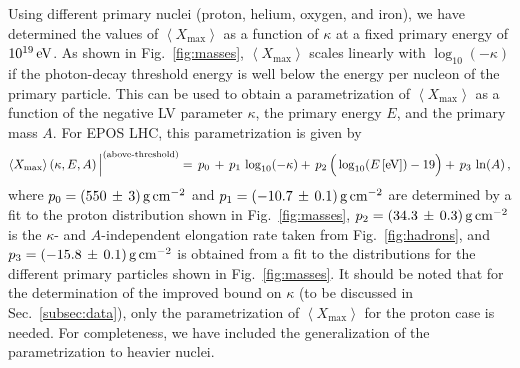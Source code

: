 \documentclass[aps,prd,preprint,longbibliography]{revtex4-1}
\begin{document}
Using different primary nuclei (proton, helium, oxygen, and iron), we have determined
the values of $\left<X_\text{max}\right>$ as a function of $\kappa$ at
a fixed primary energy of $\unit[10^{19}]{eV}$.
As shown in Fig.~\ref{fig:masses},
$\left<X_\text{max}\right>$ scales linearly
with $\log_{10}(-\kappa)$ if the photon-decay
threshold energy is well below the energy per nucleon
of the primary particle. This can be used to obtain a
parametrization of $\left<X_\text{max}\right>$ as a function of
the negative LV parameter $\kappa$,
the primary energy $E$, and the primary mass $A$. For EPOS LHC, this
parametrization is given by%
\begin{equation}
\left<X_\text{max}\right>(\kappa, E, A)
\,\Big|^\text{(above-threshold)}
=\,p_0\,+\,p_1\,\log_{10}(-\kappa)\\
+\,p_2\,\Big(\log_{10}(E\,\unit{[eV]})-19\Big)\\
+\,p_3\,\ln(A)\,,
\label{eq:xmaxparametrization}
\end{equation}
where $p_0 = \unit[(550\,\pm\,3)]{g\,cm^{-2}}$ and $p_1 =
\unit[(-10.7\,\pm\,0.1)]{g\,cm^{-2}}$ are determined by a fit to the
proton distribution shown in Fig.~\ref{fig:masses}, $p_2 =
\unit[(34.3\,\pm\,0.3)]{g\,cm^{-2}}$ is the $\kappa$- and $A$-independent elongation rate
taken from Fig.~\ref{fig:hadrons}, and $p_3 = \unit[(-15.8\,\pm\,0.1)]{g\,cm^{-2}}$ is obtained
from a fit to the distributions for the different primary particles
shown in Fig.~\ref{fig:masses}. It should be noted that for the
determination of the improved bound on $\kappa$
(to be discussed in Sec.~\ref{subsec:data}),
only the parametrization of $\left<X_\text{max}\right>$ for the proton
case is needed. For completeness, we have included
the generalization of the parametrization to heavier nuclei.
\end{document}
